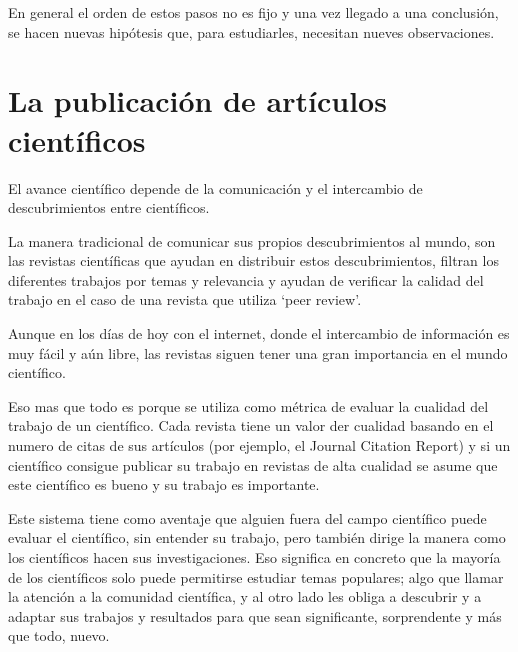 \documentclass[article]{elsarticle}
\begin{document}
\vspace{1.5\baselineskip}

En general el orden de estos pasos no es fijo y una vez llegado a una conclusión,
se hacen nuevas hipótesis que, para estudiarles, necesitan nueves observaciones.

\newpage
\section{La publicación de artículos científicos}

El avance científico depende de la comunicación y el intercambio de descubrimientos entre científicos. \par

La manera tradicional de comunicar sus propios descubrimientos al mundo, son las
revistas científicas que ayudan en distribuir estos descubrimientos, filtran los
diferentes trabajos por temas y relevancia y ayudan de verificar la calidad del
trabajo en el caso de una revista que utiliza ‘peer review’.

Aunque en los días de hoy con el internet, donde el intercambio de información
es muy fácil y aún libre, las revistas siguen tener una gran importancia en el
mundo científico.

\vspace{1.5\baselineskip}

Eso mas que todo es porque se utiliza como métrica de evaluar la cualidad del
trabajo de un científico. Cada revista tiene un valor der cualidad basando en el
numero de citas de sus artículos (por ejemplo, el Journal Citation Report) y si
un científico consigue publicar su trabajo en revistas de alta cualidad se asume
que este científico es bueno y su trabajo es importante.

\vspace{1.5\baselineskip}

Este sistema tiene como aventaje que alguien fuera del campo científico puede
evaluar el científico, sin entender su trabajo, pero también dirige la manera
como los científicos hacen sus investigaciones. Eso significa en concreto que
la mayoría de los científicos solo puede permitirse estudiar temas populares;
algo que llamar la atención a la comunidad científica, y al otro lado les obliga
a descubrir y a adaptar sus trabajos y resultados para que sean significante,
sorprendente y más que todo, nuevo.

\vspace{1.5\baselineskip}
\end{document}
